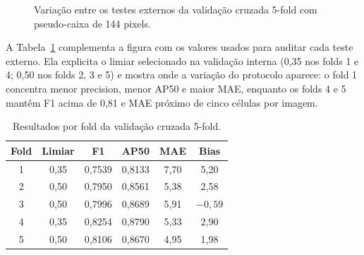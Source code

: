 \begin{figure}[htbp]
\centering
{}
\caption{Varia\c{c}\~ao entre os testes externos da valida\c{c}\~ao cruzada 5-fold com pseudo-caixa de
144 pixels.}
\label{fig:kfold-pgf}
\end{figure}

A Tabela~\ref{tab:kfold-folds} complementa a figura com os valores usados para
auditar cada teste externo. Ela explicita o limiar selecionado na valida\c{c}\~ao
interna (0,35 nos folds 1 e 4; 0,50 nos folds 2, 3 e 5) e mostra onde a
varia\c{c}\~ao do protocolo aparece: o fold 1 concentra menor precision, menor AP50
e maior MAE, enquanto os folds 4 e 5 mant\^em F1 acima de 0,81 e MAE pr\'oximo de
cinco c\'elulas por imagem.

\begin{table}[htbp]
\centering
\caption{Resultados por fold da valida\c{c}\~ao cruzada 5-fold.}
\label{tab:kfold-folds}
\small
\setlength{\tabcolsep}{4pt}
\begin{tabular}{cccccc}
\toprule
Fold & Limiar & F1 & AP50 & MAE & Bias \\
\midrule
1 & 0,35 & 0,7539 & 0,8133 & 7,70 & 5,20 \\
2 & 0,50 & 0,7950 & 0,8561 & 5,38 & 2,58 \\
3 & 0,50 & 0,7996 & 0,8689 & 5,91 & $-0,59$ \\
4 & 0,35 & 0,8254 & 0,8790 & 5,33 & 2,90 \\
5 & 0,50 & 0,8106 & 0,8670 & 4,95 & 1,98 \\
\bottomrule
\end{tabular}
\end{table}

